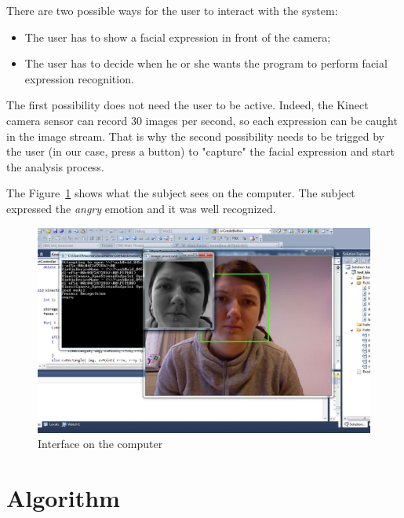 \vspace{\baselineskip}
\noindent There are two possible ways for the user to interact with the system:
\begin{itemize}
  \item The user has to show a facial expression in front of the camera;
  \item The user has to decide when he or she wants the program to perform facial expression recognition.
\end{itemize}

\noindent The first possibility does not need the user to be active. Indeed, the Kinect camera sensor can record 30 images per second, so each expression can be caught in the image stream. That is why the second possibility needs to be trigged by the user (in our case, press a button) to "capture" the facial expression and start the analysis process. 
\newline

\noindent The Figure~\ref{interface_computer} shows what the subject sees on the computer. The subject expressed the \textit{angry} emotion and it was well recognized.
\newline

\begin{figure}[!h]
\begin{center}
\noindent \includegraphics[scale=0.4]{figures/interface_computer} 
\newline
\caption{Interface on the computer}
\label{interface_computer}
\end{center} 
\end{figure}

\section{Algorithm}

